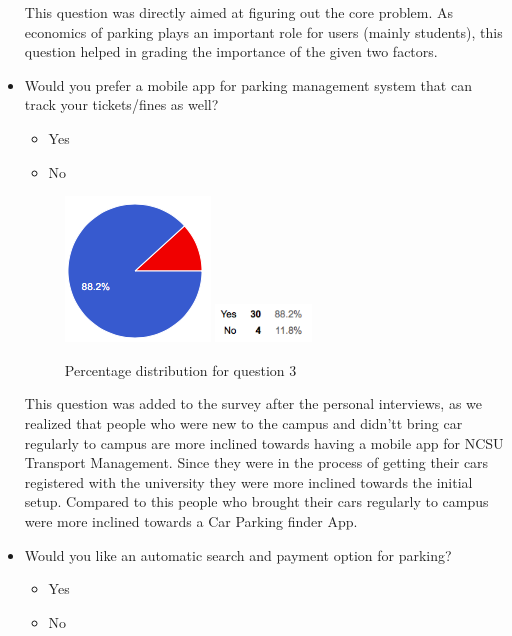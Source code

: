 \documentclass{acm_proc_article-sp}
\begin{document}
\begin{itemize}
    This question was directly aimed at figuring out the core problem. As economics of parking plays an important role for users (mainly students), this question helped in grading the importance of the given two factors.

    \item Would you prefer a mobile app for parking management system that can track your tickets/fines as well?
    \begin{itemize}
        \item Yes
        \item No
    \end{itemize}
    
    \begin{figure}[h!]
        \includegraphics{Q_3}
        \includegraphics[height = 1cm]{Q3_3}
        \caption{Percentage distribution for question 3}
        \label{fig:Q3_3}
    \end{figure}
    
    This question was added to the survey after the personal interviews, as we realized that people who were new to the campus and didn't\textsc{}t bring car regularly to campus are more inclined towards having a mobile app for NCSU Transport Management. Since they were in the process of getting their cars registered with the university they were more inclined towards the initial setup. Compared to this people who brought their cars regularly to campus were more inclined towards a Car Parking finder App.
    
    \item Would you like an automatic search and payment option for parking?
    \begin{itemize}
        \item Yes
        \item No
    \end{itemize}
    

\end{itemize}
\end{document}
